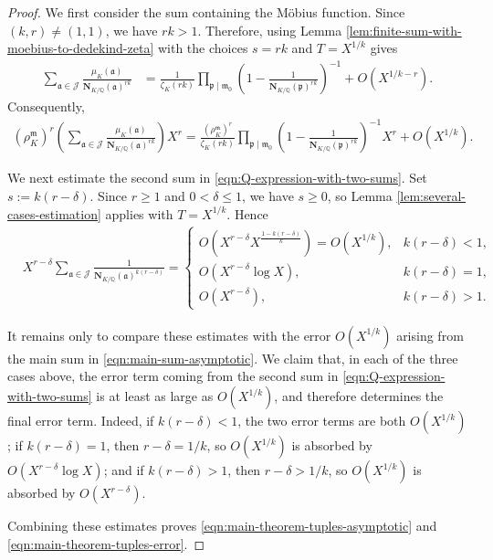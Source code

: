 \documentclass[10pt,a4paper]{amsart}
\newcommand{\Nrm}[2]{\mathbf{N}_{#1}(#2)}
\newcommand{\Q}{\mathbb{Q}}
\begin{document}
\begin{proof}
We first consider the sum containing the M\"obius function.
Since $(k,r)\neq(1,1)$, we have $rk>1$. Therefore, using
Lemma \ref{lem:finite-sum-with-moebius-to-dedekind-zeta} with the choices $s=rk$ and $T=X^{1/k}$ gives
\begin{align}
\sum_{\mathfrak{a}\in\mathcal{J}}
\frac{\mu_K(\mathfrak{a})}
{\Nrm{K/\Q}{\mathfrak{a}}^{rk}}
&=
\frac{1}{\zeta_K(rk)}
\prod_{\mathfrak{p}\mid\mathfrak{m}_0}
\left(
1-\frac{1}
{\Nrm{K/\Q}{\mathfrak{p}}^{rk}}
\right)^{-1}
+
O\left(X^{1/k - r}\right).
\end{align}
Consequently,
\begin{align}
\left(\rho_K^{\mathfrak{m}}\right)^r
\left(
\sum_{\mathfrak{a}\in\mathcal{J}}
\frac{\mu_K(\mathfrak{a})}
{\Nrm{K/\Q}{\mathfrak{a}}^{rk}}
\right)X^r =
\frac{\left(\rho_K^{\mathfrak{m}}\right)^r}
{\zeta_K(rk)}
\prod_{\mathfrak{p}\mid\mathfrak{m}_0}
\left(
1-\frac{1}
{\Nrm{K/\Q}{\mathfrak{p}}^{rk}}
\right)^{-1} X^r + O\left(X^{1/k}\right).
\label{eqn:main-sum-asymptotic}
\end{align}

We next estimate the second sum in \eqref{eqn:Q-expression-with-two-sums}. Set $s:=k(r-\delta)$. Since $r\geq1$ and $0<\delta\leq1$, we have $s\geq0$, so
Lemma \ref{lem:several-cases-estimation} applies with
$T=X^{1/k}$. Hence
\begin{align}
&X^{r-\delta}
\sum_{\mathfrak{a}\in\mathcal{J}}
\frac{1}
{\Nrm{K/\Q}{\mathfrak{a}}^{k(r-\delta)}}
=
\begin{cases}
\displaystyle
O\left(
X^{r-\delta}
X^{\frac{1-k(r-\delta)}{k}}
\right)
=
O\left(X^{1/k}\right),
&
k(r-\delta)<1,
\\[10pt]
\displaystyle
O\left(
X^{r-\delta}\log X
\right),
&
k(r-\delta)=1,
\\[10pt]
\displaystyle
O\left(
X^{r-\delta}
\right),
&
k(r-\delta)>1.
\end{cases}
\label{eqn:secondary-error-cases}
\end{align}


It remains only to compare these estimates with the error
$O(X^{1/k})$ arising from the main sum in
\eqref{eqn:main-sum-asymptotic}. We claim that, in each of the three
cases above, the error term coming from the second sum in
\eqref{eqn:Q-expression-with-two-sums} is at least as large as
$O(X^{1/k})$, and therefore determines the final error term. Indeed,
if $k(r-\delta)<1$, the two error terms are both $O(X^{1/k})$; if
$k(r-\delta)=1$, then $r-\delta=1/k$, so
$O(X^{1/k})$ is absorbed by
$O(X^{r-\delta}\log X)$; and if $k(r-\delta)>1$, then
$r-\delta>1/k$, so $O(X^{1/k})$ is absorbed by
$O(X^{r-\delta})$.

Combining these estimates proves \eqref{eqn:main-theorem-tuples-asymptotic} and \eqref{eqn:main-theorem-tuples-error}.
\end{proof}
\end{document}
